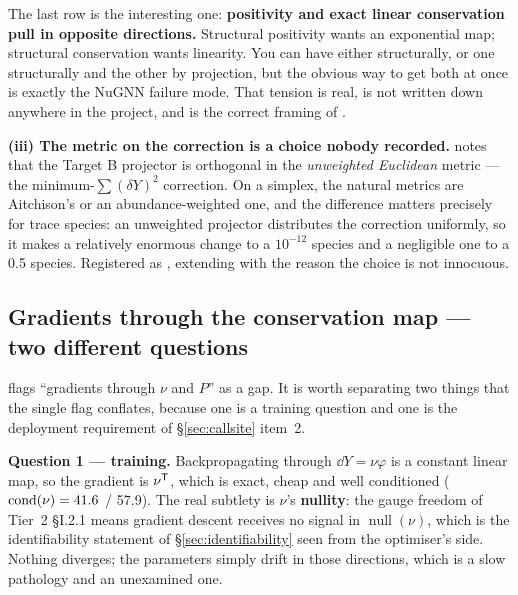 The last row is the interesting one: \textbf{positivity and exact linear
conservation pull in opposite directions.} Structural positivity wants an
exponential map; structural conservation wants linearity. You can have either
structurally, or one structurally and the other by projection, but the obvious
way to get both at once is exactly the NuGNN failure mode. That tension is
real, is not written down anywhere in the project, and is the correct framing
of .

\textbf{(iii) The metric on the correction is a choice nobody recorded.}
 notes that the Target B projector is orthogonal in the
\emph{unweighted Euclidean} metric --- the minimum-$\sum(\delta Y)^2$
correction. On a simplex, the natural metrics are Aitchison's or an
abundance-weighted one, and the difference matters precisely for trace species:
an unweighted projector distributes the correction uniformly, so it makes a
relatively enormous change to a $10^{-12}$ species and a negligible one to a
0.5 species. Registered as , extending  with the
reason the choice is not innocuous.

\subsection{Gradients through the conservation map --- two different questions}
\label{sec:gradients}

 flags ``gradients through $\nu$ and $P$'' as a gap. It is
worth separating two things that the single flag conflates, because one is a
training question and one is the deployment requirement of
\S\ref{sec:callsite} item~2.

\textbf{Question 1 --- training.} Backpropagating through $\dd Y = \nu\varphi$
is a constant linear map, so the gradient is $\nu^{\mathsf{T}}$, which is exact, cheap
and well conditioned ($\operatorname{cond}(\nu) = 41.6$ / 57.9). The real subtlety is
$\nu$'s \textbf{nullity}: the gauge freedom of Tier~2 \S I.2.1 means gradient
descent receives no signal in $\operatorname{null}(\nu)$, which is the
identifiability statement of \S\ref{sec:identifiability} seen from the
optimiser's side. Nothing diverges; the parameters simply drift in those
directions, which is a slow pathology and an unexamined one.

